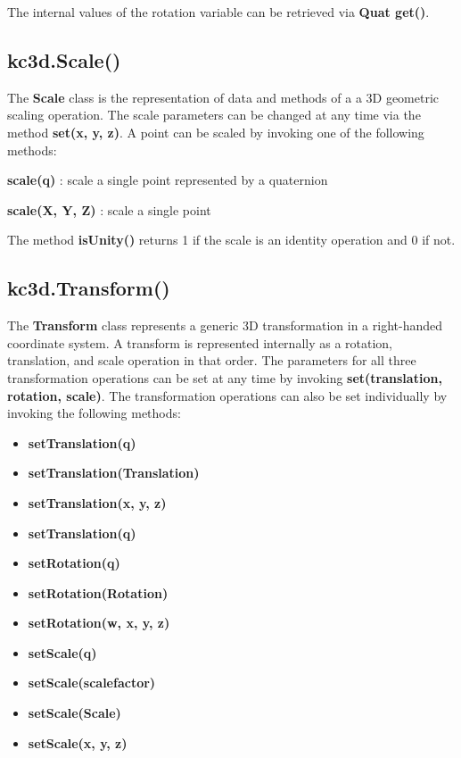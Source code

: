 The internal values of the rotation variable can be retrieved via \textbf{Quat get()}.

\subsection{kc3d.Scale()}
The \textbf{Scale} class is the representation of data and methods of a
a 3D geometric scaling operation.  The scale parameters can be changed at
any time via the method \textbf{set(x, y, z)}. A point can be scaled by invoking
one of the following methods:

\textbf{scale(q)} : scale a single point represented by a quaternion

\textbf{scale(X, Y, Z)} : scale a single point

The method \textbf{isUnity()} returns 1 if the scale is an identity operation and
0 if not.

\subsection{kc3d.Transform()}
The \textbf{Transform} class represents a generic 3D transformation in a right-handed
coordinate system. A transform is represented internally as a rotation, translation,
and scale operation in that order.  The parameters for all three transformation
operations can be set at any time by invoking \textbf{set(translation, rotation, scale)}.
The transformation operations can also be set individually by invoking the
following methods:

\begin{itemize}
\item \textbf{setTranslation(q)}\\
\item \textbf{setTranslation(Translation)}\\
\item \textbf{setTranslation(x, y, z)}\\
\item \textbf{setTranslation(q)}\\
\item \textbf{setRotation(q)}\\
\item \textbf{setRotation(Rotation)}\\
\item \textbf{setRotation(w, x, y, z)}\\
\item \textbf{setScale(q)}\\
\item \textbf{setScale(scalefactor)}\\
\item \textbf{setScale(Scale)}\\
\item \textbf{setScale(x, y, z)}\\
\end{itemize}

